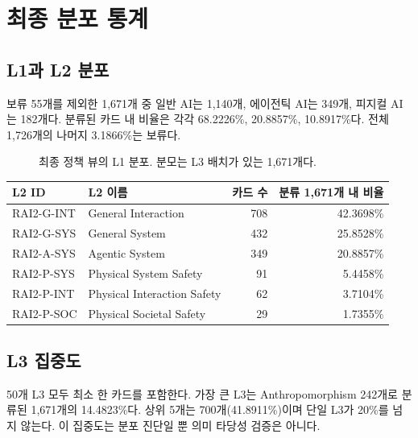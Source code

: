 \documentclass[11pt,a4paper]{article}
\begin{document}
\section{최종 분포 통계}

\subsection{L1과 L2 분포}

보류 55개를 제외한 1,671개 중 일반 AI는 1,140개, 에이전틱 AI는 349개,
피지컬 AI는 182개다. 분류된 카드 내 비율은 각각 68.2226\%, 20.8857\%,
10.8917\%다. 전체 1,726개의 나머지 3.1866\%는 보류다.

\begin{figure}[H]
\centering
{}
\caption{최종 정책 뷰의 L1 분포. 분모는 L3 배치가 있는 1,671개다.}
\end{figure}

\begin{longtable}{llrr}
\toprule
L2 ID & L2 이름 & 카드 수 & 분류 1,671개 내 비율 \\
\midrule
\endhead
RAI2-G-INT & General Interaction & 708 & 42.3698\% \\
RAI2-G-SYS & General System & 432 & 25.8528\% \\
RAI2-A-SYS & Agentic System & 349 & 20.8857\% \\
RAI2-P-SYS & Physical System Safety & 91 & 5.4458\% \\
RAI2-P-INT & Physical Interaction Safety & 62 & 3.7104\% \\
RAI2-P-SOC & Physical Societal Safety & 29 & 1.7355\% \\
\bottomrule
\end{longtable}

\subsection{L3 집중도}

50개 L3 모두 최소 한 카드를 포함한다. 가장 큰 L3는 Anthropomorphism 242개로
분류된 1,671개의 14.4823\%다. 상위 5개는 700개(41.8911\%)이며 단일 L3가
20\%를 넘지 않는다. 이 집중도는 분포 진단일 뿐 의미 타당성 검증은 아니다.
\end{document}
